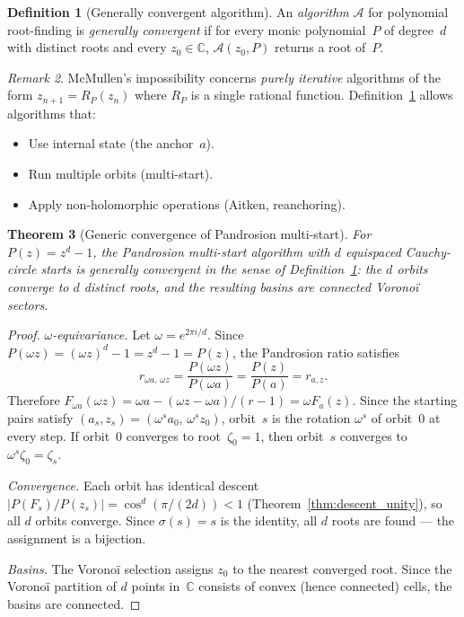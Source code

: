 \documentclass[10pt,a4paper,oneside]{book}
\newtheorem{theorem}{Theorem}[chapter]
\theoremstyle{definition}
\newtheorem{definition}[theorem]{Definition}
\theoremstyle{remark}
\newtheorem{remark}[theorem]{Remark}
\begin{document}
\begin{definition}[Generally convergent algorithm]
\label{def:gen_conv}
An \emph{algorithm} $\mathcal{A}$ for polynomial root-finding is \emph{generally convergent} if for every monic polynomial~$P$ of degree~$d$ with distinct roots and every $z_0 \in \mathbb{C}$, $\mathcal{A}(z_0, P)$ returns a root of~$P$.
\end{definition}

\begin{remark}
McMullen's impossibility concerns \emph{purely iterative} algorithms of the form $z_{n+1} = R_P(z_n)$ where $R_P$ is a single rational function.  Definition~\ref{def:gen_conv} allows algorithms that:
\begin{itemize}[nosep]
\item Use internal state (the anchor~$a$).
\item Run multiple orbits (multi-start).
\item Apply non-holomorphic operations (Aitken, reanchoring).
\end{itemize}
\end{remark}

\begin{theorem}[Generic convergence of Pandrosion multi-start]
\label{thm:gen_conv}
For $P(z) = z^d - 1$, the Pandrosion multi-start algorithm with $d$ equispaced Cauchy-circle starts is generally convergent in the sense of Definition~\ref{def:gen_conv}: the $d$ orbits converge to $d$ \emph{distinct} roots, and the resulting basins are connected Vorono\"i sectors.
\end{theorem}

\begin{proof}
\emph{$\omega$-equivariance.}  Let $\omega = e^{2\pi i/d}$.  Since $P(\omega z) = (\omega z)^d - 1 = z^d - 1 = P(z)$, the Pandrosion ratio satisfies
\[
  r_{\omega a,\, \omega z} = \frac{P(\omega z)}{P(\omega a)} = \frac{P(z)}{P(a)} = r_{a,z}.
\]
Therefore $F_{\omega a}(\omega z) = \omega a - (\omega z - \omega a)/(r-1) = \omega F_a(z)$.  Since the starting pairs satisfy $(a_s, z_s) = (\omega^s a_0,\, \omega^s z_0)$, orbit~$s$ is the rotation $\omega^s$ of orbit~$0$ at every step.  If orbit~$0$ converges to root~$\zeta_0 = 1$, then orbit~$s$ converges to $\omega^s \zeta_0 = \zeta_s$.

\emph{Convergence.}  Each orbit has identical descent $|P(F_s)/P(z_s)| = \cos^d(\pi/(2d)) < 1$ (Theorem~\ref{thm:descent_unity}), so all $d$ orbits converge.  Since $\sigma(s) = s$ is the identity, all $d$ roots are found --- the assignment is a bijection.

\emph{Basins.}  The Vorono\"i selection assigns $z_0$ to the nearest converged root.  Since the Vorono\"i partition of $d$ points in~$\mathbb{C}$ consists of convex (hence connected) cells, the basins are connected.
\end{proof}
\end{document}
